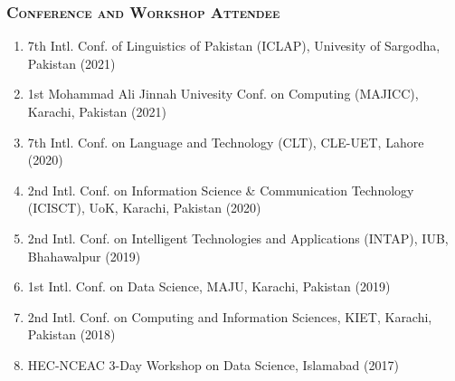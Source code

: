\documentclass[a4paper, 10pt]{article}
\begin{document}
\subsubsection*{\textsc{Conference and Workshop Attendee}}
\begin{enumerate}
\itemsep-4pt
\item 7th Intl. Conf. of Linguistics of Pakistan (ICLAP), Univesity of Sargodha, Pakistan (2021)
\item 1st Mohammad Ali Jinnah Univesity Conf. on Computing (MAJICC), Karachi, Pakistan (2021)
\item 7th Intl. Conf. on Language and Technology (CLT), CLE-UET, Lahore (2020)
\item 2nd Intl. Conf. on Information Science \& Communication Technology (ICISCT), UoK, Karachi, Pakistan (2020)
\item 2nd Intl. Conf. on Intelligent Technologies and Applications (INTAP), IUB, Bhahawalpur (2019)
\item 1st Intl. Conf. on Data Science, MAJU, Karachi, Pakistan (2019)
\item 2nd Intl. Conf. on Computing and Information Sciences, KIET, Karachi, Pakistan (2018)
\item HEC-NCEAC 3-Day Workshop on Data Science, Islamabad (2017)
\end{enumerate}

\end{document}
